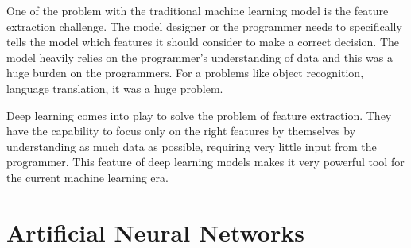 One of the problem with the traditional machine learning model is the feature extraction challenge. The model designer or the programmer needs to specifically tells the model which features it should consider to make a correct decision. The model heavily relies on the programmer's understanding of data and this was a huge burden on the programmers. For a problems like object recognition, language translation, it was a huge problem.

Deep learning comes into play to solve the problem of feature extraction. They have the capability to focus only on the right features by themselves by understanding as much data as possible, requiring very little input from the programmer. This feature of deep learning models makes it very powerful tool for the current machine learning era.

\section{Artificial Neural Networks}


